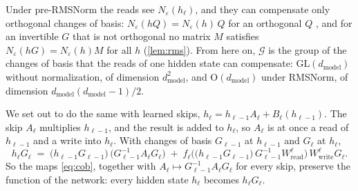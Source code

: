 \documentclass[10pt]{article}
\theoremstyle{definition}
\theoremstyle{remark}
\newcommand{\Wread}{W_{\mathrm{read}}}
\newcommand{\Wwrite}{W_{\mathrm{write}}}
\newcommand{\dm}{d_{\mathrm{model}}}
\newcommand{\GL}{\mathrm{GL}}
\newcommand{\Ort}{\mathrm{O}}
\newcommand{\G}{\mathcal{G}}
\begin{document}
Under pre-RMSNorm the reads see $N_\varepsilon(h_\ell)$, and they can compensate only orthogonal changes of basis: $N_\varepsilon(hQ) = N_\varepsilon(h)\,Q$ for an orthogonal $Q$ \citep{ganev2021universal,ashkboos2024slicegpt}, and for an invertible $G$ that is not orthogonal no matrix $M$ satisfies $N_\varepsilon(hG) = N_\varepsilon(h)M$ for all $h$ (\cref{lem:rms}). From here on, $\G$ is the group of the changes of basis that the reads of one hidden state can compensate: $\GL(\dm)$ without normalization, of dimension $\dm^2$, and $\Ort(\dm)$ under RMSNorm, of dimension $\dm(\dm-1)/2$.

We set out to do the same with learned skips, $h_\ell = h_{\ell-1}A_\ell + B_\ell(h_{\ell-1})$. The skip $A_\ell$ multiplies $h_{\ell-1}$, and the result is added to $h_\ell$, so $A_\ell$ is at once a read of $h_{\ell-1}$ and a write into $h_\ell$. With changes of basis $G_{\ell-1}$ at $h_{\ell-1}$ and $G_\ell$ at $h_\ell$,
\begin{equation}\label{eq:skipmap}
h_\ell G_\ell \;=\; \big(h_{\ell-1}G_{\ell-1}\big)\,\big(G_{\ell-1}^{-1}A_\ell G_\ell\big) \;+\; f_\ell\Big(\big(h_{\ell-1}G_{\ell-1}\big)\,G_{\ell-1}^{-1}\Wread^{\ell}\Big)\,\Wwrite^{\ell}G_\ell .
\end{equation}
So the maps \eqref{eq:cob}, together with $A_\ell \mapsto G_{\ell-1}^{-1}A_\ell G_\ell$ for every skip, preserve the function of the network: every hidden state $h_\ell$ becomes $h_\ell G_\ell$.
\end{document}
